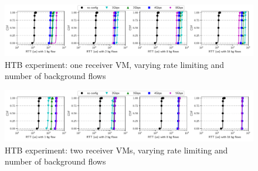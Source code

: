 
\begin{figure}[!htb]
\centering
\includegraphics[width=\textwidth]{rate_limiter/raw_data/htb_benchmark/one_receiver.pdf}
\caption{HTB experiment: one receiver VM, varying rate limiting and number of background flows}
\label{fig:htb-1rec} 
\end{figure}

\begin{figure}[!htb]
\centering
\includegraphics[width=\textwidth]{rate_limiter/raw_data/htb_benchmark/two_receivers.pdf}
\caption{HTB experiment: two receiver VMs, varying rate limiting and number of background flows}
\label{fig:htb-2rec} 
\end{figure}

